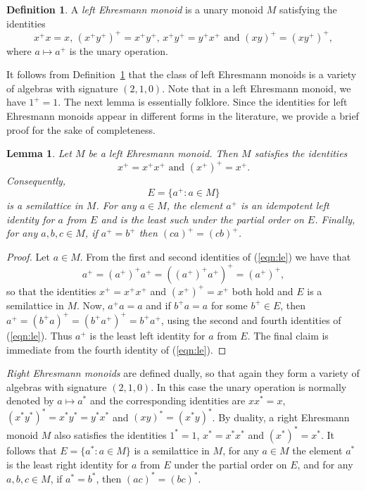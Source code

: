 \documentclass[12pt]{amsart}
\newtheorem{lem}[them]{Lemma}
\theoremstyle{definition}
\newtheorem{defn}[them]{Definition}
\theoremstyle{definition}
\numberwithin{them}{section}
\numberwithin{equation}{section}
\begin{document}
\begin{defn}\label{defn:lefte}
A {\em left Ehresmann monoid}
is a unary monoid $M$ satisfying the identities
\begin{equation}\label{eqn:le}
    x^{+} x=x,\, (x^+ y^+)^+ = x^+ y^+,\, x^+ y^+=y^+ x^+\mbox{ and }(xy)^+=(xy^+)^+, \end{equation} 
where  $a\mapsto a^+$  is the unary operation.\end{defn} 

It follows from Definition~\ref{defn:lefte} that the class of left Ehresmann monoids is a variety of algebras  with signature $(2,1,0)$.  Note that in a left Ehresmann monoid, we have $1^+=1$. The next lemma is essentially folklore. Since the identities for left Ehresmann monoids appear in different forms in the literature,  we  provide a brief proof for the sake of completeness.


\begin{lem}\label{lem:folk} Let $M$ be a left Ehresmann monoid. Then  $M$  satisfies the identities 
\begin{equation}\label{eqn:lem}
x^+=x^+ x^+\mbox{ and }(x^+)^+ = x^+.\end{equation}  
Consequently,  \[E=\{ a^+:a\in M\}\] is a semilattice in $M$. For any $a\in M$, the element $a^+$ is an idempotent left identity for $a$ from $E$ and is the least such under the partial order on $E$. Finally, for any $a,b,c\in M$, if $a^+=b^+$ then $(ca)^+=(cb)^+$. 
\end{lem}
\begin{proof} Let $a\in M$. From the first and second identities of (\ref{eqn:le}) we have that
\[a^+=(a^+)^+a^+=((a^+)^+a^+)^+=(a^+)^+,\]
so that the identities $x^+=x^+ x^+$ and $(x^+)^+ = x^+$ both hold and $E$ is a semilattice in $M$. Now, $a^+a=a$ and if $b^+a=a$ for some $b^+\in E$, then $a^+=(b^+a)^+=(b^+a^+)^+=b^+a^+$, using the second and fourth identities of  (\ref{eqn:le}). Thus $a^+$ is the least left identity for $a$  from $E$.  The final claim is immediate from the fourth identity of  (\ref{eqn:le}). \end{proof}

 {\em Right Ehresmann monoids} are defined dually,   so that again they form a variety of algebras with signature $(2,1,0)$. In this case 
 the unary operation is normally denoted by  $a\mapsto a^\ast$ 
and the corresponding identities are 
$xx^\ast=x$, $(x^\ast y^\ast)^\ast=x^\ast y^\ast=y^\ast x^\ast$ 
and $(xy)^\ast=(x^\ast y)^\ast$.   By duality, a  right Ehresmann monoid $M$  also  satisfies the identities $1^*=1$, $x^*=x^* x^*$ and $(x^*)^* = x^*$. It follows that  $E=\{ a^*:a\in M\}$ is a semilattice in $M$, for any $a\in M$  the element $a^*$ is the least right identity for $a$ from $E$  under the partial order on $E$, and   for any $a,b,c\in M$, if $a^*=b^*$, then $(ac)^*=(bc)^*$.
\end{document}
